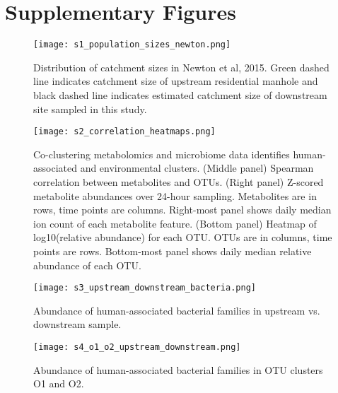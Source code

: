 \section{Supplementary Figures}

\begin{figure}[h]
\begin{center}
    \texttt{[image: s1\_population\_sizes\_newton.png]}
    \caption{Distribution of catchment sizes in Newton et al, 2015. Green dashed line indicates catchment size of upstream residential manhole and black dashed line indicates estimated catchment size of downstream site sampled in this study.}\label{24hr:figS1}
\end{center}
\end{figure}

\begin{figure}[h]
\begin{center}
    \texttt{[image: s2\_correlation\_heatmaps.png]}
    \captionsetup{font=footnotesize,labelfont=footnotesize}
    \caption{Co-clustering metabolomics and microbiome data identifies human-associated and environmental clusters. (Middle panel) Spearman correlation between metabolites and OTUs. (Right panel) Z-scored metabolite abundances over 24-hour sampling. Metabolites are in rows, time points are columns. Right-most panel shows daily median ion count of each metabolite feature. (Bottom panel) Heatmap of log10(relative abundance) for each OTU. OTUs are in columns, time points are rows. Bottom-most panel shows daily median relative abundance of each OTU.}\label{24hr:figS2}
\end{center}
\end{figure}

\begin{figure}[h]
\begin{center}
    \texttt{[image: s3\_upstream\_downstream\_bacteria.png]}
    \caption{Abundance of human-associated bacterial families in upstream vs. downstream sample.}\label{24hr:figS3}
\end{center}
\end{figure}

\begin{figure}[h]
\begin{center}
    \texttt{[image: s4\_o1\_o2\_upstream\_downstream.png]}
    \caption{Abundance of human-associated bacterial families in OTU clusters O1 and O2.}\label{24hr:figS4}
\end{center}
\end{figure}
